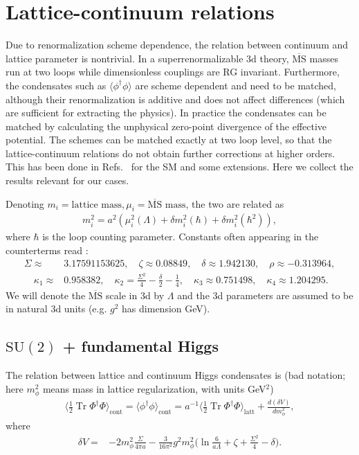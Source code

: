 \documentclass[11pt,a4paper]{article}
\newcommand\Tr{\operatorname{Tr}}
\newcommand\MSbar{$\overline{\text{MS}}$ } %
\newcommand\he[1]{#1^\dagger}%
\newcommand\gr[1]{\mathrm{#1}}%
\newcommand\lauri[1]{{\color{myorange}#1}}
\begin{document}
\appendix 

\section{Lattice-continuum relations}
\label{sec:lat-cont}

Due to renormalization scheme dependence, the relation between continuum and lattice parameter is nontrivial. In a superrenormalizable 3d theory, \MSbar masses run at two loops while dimensionless couplings are RG invariant. Furthermore, the condensates such as $\langle \phi^\dagger\phi \rangle$ are scheme dependent and need to be matched, although their renormalization is additive and does not affect differences (which are sufficient for extracting the physics). In practice the condensates can be matched by calculating the unphysical zero-point divergence of the effective potential. The schemes can be matched exactly at two loop level, so that the lattice-continuum relations do not obtain further corrections at higher orders. This has been done in Refs.~\cite{Laine:1995np, Laine:1997dy} for the SM and some extensions. Here we collect the results relevant for our cases.

Denoting $m_i = \text{lattice mass}, \mu_i = \text{\MSbar mass}$, the two are related as 
\begin{align}
m^2_i = a^2 (\mu^2_i(\Lambda) + \delta m^2_i(\hbar) + \delta m^2_i(\hbar^2) ),
\end{align}
where $\hbar$ is the loop counting parameter. Constants often appearing in the counterterms read \cite{Laine:1997dy}: 
\begin{align}
\Sigma \approx& 3.17591153625, \quad \zeta \approx 0.08849, \quad \delta \approx 1.942130, \quad \rho \approx -0.313964, \nonumber \\ 
\quad \kappa_1 \approx& 0.958382, \quad \kappa_2 = \frac{\Sigma^2}{4} - \frac{\delta}{2} - \frac14, \quad \kappa_3 \approx 0.751498, \quad \kappa_4 \approx 1.204295.
\end{align}
We will denote the \MSbar scale in 3d by $\Lambda$ and the 3d parameters are assumed to be in natural 3d units (e.g. $g^2$ has dimension GeV).

\subsection{$\gr{SU(2)}$ + fundamental Higgs}

The relation between lattice and continuum Higgs condensates is \lauri{(bad notation; here $m^2_\phi$ means mass in lattice regularization, with units GeV$^2$)}
\begin{align}
\langle \frac12\Tr\he\Phi\Phi\rangle_\text{cont} = \langle\phi^\dagger\phi\rangle_\text{cont} = a^{-1}\langle \frac12\Tr\he\Phi\Phi\rangle_\text{latt} + \frac{d(\delta V)}{dm^2_\phi}, 
\end{align}
where 
\begin{align}
\label{eq:vacuumCT_higgs}
\delta V =& - 2 m^2_\phi \frac{\Sigma}{4\pi a} - \frac{3}{16\pi^2} g^2 m^2_\phi \Big( \ln \frac{6}{a \Lambda} +\zeta + \frac{\Sigma^2}{4} - \delta \Big).
\end{align}
\end{document}
